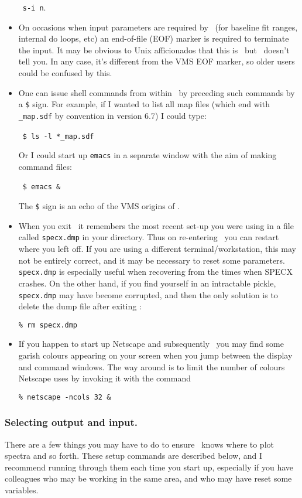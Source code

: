 \begin{itemize}
\SP\ {\tt s-i n}.
\item
On occasions when input parameters are required by \SPECX\ (for
baseline fit ranges, internal do loops, etc) an end-of-file (EOF)
marker is required to terminate the input. It may be obvious to Unix
afficionados that this is \ctrld\, but \SPECX\ doesn't tell you. In
any case, it's different from the VMS EOF marker, so older users could
be confused by this.
\item
One can issue shell commands from within \SPECX\ by preceding such
commands by a {\tt \$} sign. For example, if I wanted to list all map
files (which end with {\tt \_map.sdf} by convention in version 6.7) I
could type:

\SP\ \verb|$ ls -l *_map.sdf|

Or I could start up {\tt emacs} in a separate window with the aim of
making command files:

\SP\ \verb|$ emacs &|

The {\tt \$} sign is an echo of the VMS origins of \SPECX .
\item
When you exit \SPECX\ it remembers the most recent set-up you were
using in a file called {\tt specx.dmp} in your directory. Thus on
re-entering \SPECX\ you can restart where you left off. If you are
using a different terminal/workstation, this may not be entirely
correct, and it may be necessary to reset some parameters. {\tt
specx.dmp} is especially useful when recovering from the times when
SPECX crashes. On the other hand, if you find yourself in an
intractable pickle, {\tt specx.dmp} may have become corrupted, and
then the only solution is to delete the dump file after exiting 
\SPECX:

\verb|% rm specx.dmp|

\item
If you happen to start up {\sc Netscape} and subsequently \SPECX\ you
may find some garish colours appearing on your screen when you jump
between the display and command windows. The way around is to limit
the number of colours {\sc Netscape} uses by invoking it with the
command

\verb|% netscape -ncols 32 &|

\end{itemize}

\subsubsection{Selecting output and input.}
\label{sec:preparing-specx}
There are a few things you may have to do to ensure \SPECX\ knows where to
plot spectra and so forth. These setup commands are described below,
and I recommend running through them each time you start up,
especially if you have colleagues who may be working in the same area,
and who may have reset some variables.

